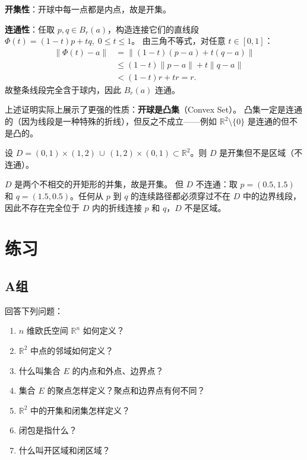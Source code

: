 \documentclass[lang=cn,11pt]{elegantbook}
\begin{document}
\begin{solution}
\textbf{开集性}：开球中每一点都是内点，故是开集。

\textbf{连通性}：任取 $p,q\in B_r(a)$，构造连接它们的直线段 $\Phi(t)=(1-t)p+tq,\; 0\leqslant  t\leqslant  1$。
由三角不等式，对任意 $t\in[0,1]$：
\begin{align*}
\|\Phi(t)-a\| &= \|(1-t)(p-a)+t(q-a)\| \\
&\leqslant  (1-t)\|p-a\|+t\|q-a\| \\
&< (1-t)r+tr = r.
\end{align*}
故整条线段完全含于球内，因此 $B_r(a)$ 连通。
\end{solution}

\begin{remark}[凸性蕴含连通性]
上述证明实际上展示了更强的性质：\textbf{开球是凸集}（Convex Set）。
凸集一定是连通的（因为线段是一种特殊的折线），但反之不成立——例如 $\mathbb R^2\setminus\{0\}$ 是连通的但不是凸的。
\end{remark}

\begin{exercise}[开但不连通的集合] \label{ex:not-region}
设 $D=(0,1)\times(1,2)\,\cup\,(1,2)\times(0,1)\subset\mathbb R^2$。则 $D$ 是开集但不是区域（不连通）。
\end{exercise}

\begin{solution}
$D$ 是两个不相交的开矩形的并集，故是开集。
但 $D$ 不连通：取 $p=(0.5,1.5)$ 和 $q=(1.5,0.5)$。任何从 $p$ 到 $q$ 的连续路径都必须穿过不在 $D$ 中的边界线段，因此不存在完全位于 $D$ 内的折线连接 $p$ 和 $q$，$D$ 不是区域。
\end{solution}

\section{练习}

\subsection{A组}

\begin{exercise}[基本概念问答]
回答下列问题：
\begin{enumerate}
  \item[(1)] $n$ 维欧氏空间 $\mathbb{R}^n$ 如何定义？
  \item[(2)] $\mathbb{R}^2$ 中点的邻域如何定义？
  \item[(3)] 什么叫集合 $E$ 的内点和外点、边界点？
  \item[(4)] 集合 $E$ 的聚点怎样定义？聚点和边界点有何不同？
  \item[(5)] $\mathbb{R}^2$ 中的开集和闭集怎样定义？
  \item[(6)] 闭包是指什么？
  \item[(7)] 什么叫开区域和闭区域？
\end{enumerate}
\end{exercise}
\end{document}
